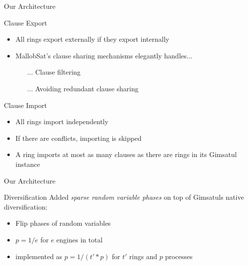 \documentclass{beamer}
\begin{document}
\begin{frame}{Our Architecture}
    \begin{block}{Clause Export}
        \begin{itemize}
            \item All rings export externally if they export internally
            \item MallobSat's clause sharing mechanisms elegantly handles...
            \begin{itemize}
                \item[...] Clause filtering
                \item[...] Avoiding redundant clause sharing
            \end{itemize}
        \end{itemize}
    \end{block}

    \begin{block}{Clause Import}
        \begin{itemize}
            \item All rings import independently
            \item If there are conflicts, importing is skipped
            \item A ring imports at most as many clauses as there are rings in its Gimsatul instance
        \end{itemize}
    \end{block}
\end{frame}

\begin{frame}{Our Architecture}
    \begin{block}{Diversification}
        Added \textit{sparse random variable phases} on top of Gimsatuls native diversification:
        \begin{itemize}
            \item Flip phases of random variables
            \item $p = 1 / e$ for $e$ engines in total
            \item implemented as $p = 1 / (t' * p)$ for $t'$ rings and $p$ processes
        \end{itemize}
    \end{block}
\end{frame}
\end{document}
